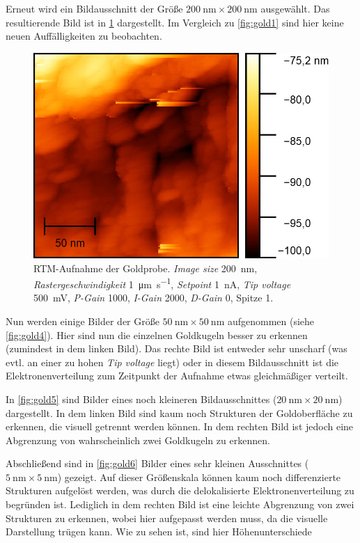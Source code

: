 Erneut wird ein Bildausschnitt der Größe $\SI{200}{\nano \meter} \times \SI{200}{\nano \meter}$ ausgewählt. Das resultierende Bild ist in \cref{fig:gold3}
dargestellt. Im Vergleich zu \cref{fig:gold1} sind hier keine neuen Auffälligkeiten zu beobachten.
\begin{figure}[H]
	\centering
	\includegraphics[width=0.6\linewidth]{../figs/Gold10468.png}
	\caption{RTM-Aufnahme der Goldprobe. \textit{Image size} \SI{200}{\nano \meter}, \textit{Rastergeschwindigkeit} \SI{1}{\micro\meter \per \second}, \textit{Setpoint} \SI{1}{\nano \ampere},
    \textit{Tip voltage} \SI{500}{\milli \volt}, \textit{P-Gain} \num{1000}, \textit{I-Gain} \num{2000}, \textit{D-Gain} \num{0}, Spitze 1.}
	\label{fig:gold3}
\end{figure} Nun werden einige Bilder der Größe $\SI{50}{\nano \meter} \times \SI{50}{\nano \meter}$ aufgenommen (siehe \cref{fig:gold4}). Hier sind nun die einzelnen Goldkugeln
besser zu erkennen (zumindest in dem linken Bild). Das rechte Bild ist entweder sehr unscharf (was evtl. an einer zu hohen \textit{Tip voltage} liegt) oder in diesem Bildausschnitt
ist die Elektronenverteilung zum Zeitpunkt der Aufnahme etwas gleichmäßiger verteilt.\par
In \cref{fig:gold5} sind Bilder eines noch kleineren Bildausschnittes ($\SI{20}{\nano \meter} \times \SI{20}{\nano \meter}$) dargestellt. In dem linken Bild sind kaum noch Strukturen der
Goldoberfläche zu erkennen, die visuell getrennt werden können. In dem rechten Bild ist jedoch eine Abgrenzung von wahrscheinlich zwei Goldkugeln zu erkennen.\par
Abschließend sind in \cref{fig:gold6} Bilder eines sehr kleinen Ausschnittes ($\SI{5}{\nano \meter} \times \SI{5}{\nano \meter}$) gezeigt. Auf dieser Größenskala
können kaum noch differenzierte Strukturen aufgelöst werden, was durch die delokalisierte Elektronenverteilung zu begründen ist. Lediglich in dem rechten Bild ist eine leichte
Abgrenzung von zwei Strukturen zu erkennen, wobei hier aufgepasst werden muss, da die visuelle Darstellung trügen kann. Wie zu sehen ist, sind hier Höhenunterschiede
